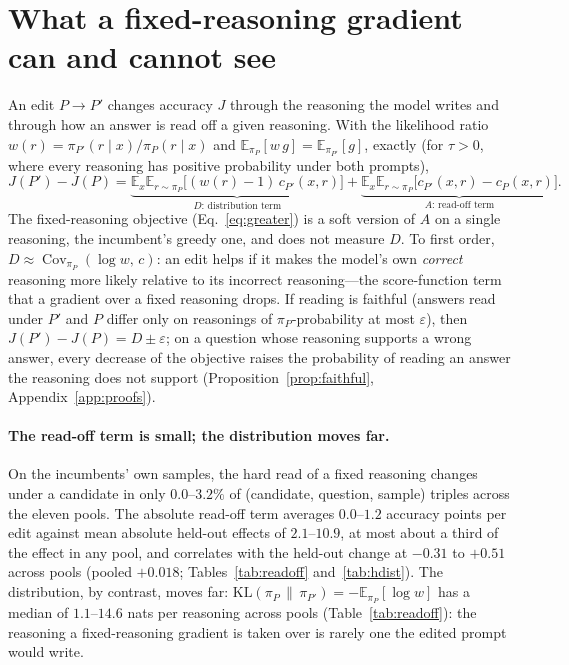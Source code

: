 \section{What a fixed-reasoning gradient can and cannot see}
\label{sec:theory}

An edit $P\to P'$ changes accuracy $J$ through the reasoning the model writes and through how an
answer is read off a given reasoning. With the likelihood ratio
$w(r)=\pi_{P'}(r\mid x)/\pi_P(r\mid x)$ and $\mathbb{E}_{\pi_P}[w\,g]=\mathbb{E}_{\pi_{P'}}[g]$,
exactly (for $\tau>0$, where every reasoning has positive probability under both prompts),
\begin{equation}
J(P')-J(P)=\underbrace{\mathbb{E}_{x}\mathbb{E}_{r\sim\pi_P}\big[(w(r)-1)\,c_{P'}(x,r)\big]}_{D\text{: distribution term}}
+\underbrace{\mathbb{E}_{x}\mathbb{E}_{r\sim\pi_P}\big[c_{P'}(x,r)-c_P(x,r)\big]}_{A\text{: read-off term}} .
\label{eq:decomp}
\end{equation}
The fixed-reasoning objective (Eq.~\ref{eq:greater}) is a soft version of $A$ on a single
reasoning, the incumbent's greedy one, and does not measure $D$. To first order,
$D\approx\operatorname{Cov}_{\pi_P}(\log w,\,c)$: an edit helps if it makes the model's own
\emph{correct} reasoning more likely relative to its incorrect reasoning---the score-function term
that a gradient over a fixed reasoning drops. If reading is faithful (answers read under $P'$ and
$P$ differ only on reasonings of $\pi_P$-probability at most $\varepsilon$), then
$J(P')-J(P)=D\pm\varepsilon$; on a question whose reasoning supports a wrong answer, every decrease
of the objective raises the probability of reading an answer the reasoning does not support
(Proposition~\ref{prop:faithful}, Appendix~\ref{app:proofs}).

\paragraph{The read-off term is small; the distribution moves far.} On the incumbents' own samples,
the hard read of a fixed reasoning changes under a candidate in only $0.0$--$3.2\%$ of (candidate,
question, sample) triples across the eleven pools. The absolute read-off term averages $0.0$--$1.2$
accuracy points per edit against mean absolute held-out effects of $2.1$--$10.9$, at most about a
third of the effect in any pool, and correlates with the held-out change at $-0.31$ to $+0.51$ across
pools (pooled $+0.018$; Tables~\ref{tab:readoff} and~\ref{tab:hdist}). The distribution, by contrast,
moves far: $\mathrm{KL}(\pi_P\,\|\,\pi_{P'})=-\mathbb{E}_{\pi_P}[\log w]$ has a median of $1.1$--$14.6$ nats per reasoning across pools (Table~\ref{tab:readoff}): the
reasoning a fixed-reasoning gradient is taken over is rarely one the edited prompt would write.

